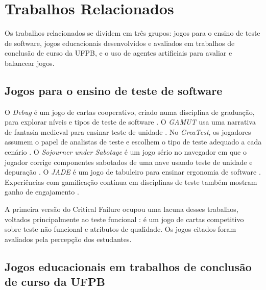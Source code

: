 \section{Trabalhos Relacionados}
\label{sec:relacionados}

Os trabalhos relacionados se dividem em três grupos: jogos para o ensino de teste de software, jogos
educacionais desenvolvidos e avaliados em trabalhos de conclusão de curso da UFPB, e o uso de agentes
artificiais para avaliar e balancear jogos.

\subsection{Jogos para o ensino de teste de software}

O \emph{Debug} é um jogo de cartas cooperativo, criado numa disciplina de graduação, para explorar níveis e
tipos de teste de software \cite{costa2024debug}. O \emph{GAMUT} usa uma narrativa de fantasia medieval para
ensinar teste de unidade \cite{gomes2021gamut}. No \emph{GreaTest}, os jogadores assumem o papel de analistas de
teste e escolhem o tipo de teste adequado a cada cenário \cite{beppe2018greatest}. O \emph{Sojourner under
Sabotage} é um jogo sério no navegador em que o jogador corrige componentes sabotados de uma nave usando teste
de unidade e depuração \cite{straubinger2025sojourner}. O \emph{JADE} é um jogo de tabuleiro para ensinar
ergonomia de software \cite{jeandaubias2023jade}. Experiências com gamificação contínua em disciplinas de teste
também mostram ganho de engajamento \cite{straubinger2024ci,jesus2020,blanco2023}.

A primeira versão do Critical Failure \cite{oliveira2025critical} ocupou uma lacuna desses trabalhos, voltados
principalmente ao teste funcional : é um jogo de
cartas competitivo sobre teste não funcional e atributos de qualidade. Os jogos citados foram avaliados pela
percepção dos estudantes. 

\subsection{Jogos educacionais em trabalhos de conclusão de curso da UFPB}


